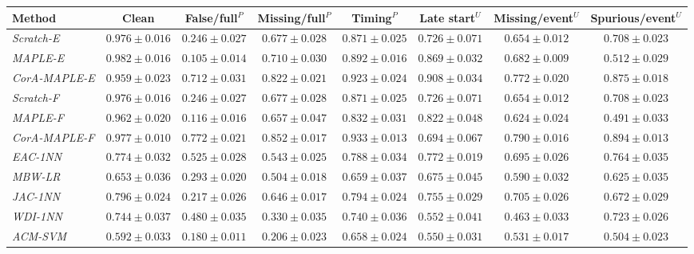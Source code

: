 \begin{tabular*}{\textwidth}{@{\extracolsep{\fill}}lccccccc@{}}
\toprule
Method & Clean & False/full$^{P}$ & Missing/full$^{P}$ & Timing$^{P}$ & Late start$^{U}$ & Missing/event$^{U}$ & Spurious/event$^{U}$ \\
\midrule
\emph{Scratch-E} & $0.976\pm0.016$ & $0.246\pm0.027$ & $0.677\pm0.028$ & $0.871\pm0.025$ & $0.726\pm0.071$ & $0.654\pm0.012$ & $0.708\pm0.023$ \\
\emph{MAPLE-E} & $\mathbf{0.982}\pm0.016$ & $0.105\pm0.014$ & $0.710\pm0.030$ & $0.892\pm0.016$ & $0.869\pm0.032$ & $0.682\pm0.009$ & $0.512\pm0.029$ \\
\emph{CorA-MAPLE-E} & $0.959\pm0.023$ & $0.712\pm0.031$ & $0.822\pm0.021$ & $0.923\pm0.024$ & $\mathbf{0.908}\pm0.034$ & $0.772\pm0.020$ & $0.875\pm0.018$ \\
\emph{Scratch-F} & $0.976\pm0.016$ & $0.246\pm0.027$ & $0.677\pm0.028$ & $0.871\pm0.025$ & $0.726\pm0.071$ & $0.654\pm0.012$ & $0.708\pm0.023$ \\
\emph{MAPLE-F} & $0.962\pm0.020$ & $0.116\pm0.016$ & $0.657\pm0.047$ & $0.832\pm0.031$ & $0.822\pm0.048$ & $0.624\pm0.024$ & $0.491\pm0.033$ \\
\emph{CorA-MAPLE-F} & $0.977\pm0.010$ & $\mathbf{0.772}\pm0.021$ & $\mathbf{0.852}\pm0.017$ & $\mathbf{0.933}\pm0.013$ & $0.694\pm0.067$ & $\mathbf{0.790}\pm0.016$ & $\mathbf{0.894}\pm0.013$ \\
\emph{EAC-1NN} & $0.774\pm0.032$ & $0.525\pm0.028$ & $0.543\pm0.025$ & $0.788\pm0.034$ & $0.772\pm0.019$ & $0.695\pm0.026$ & $0.764\pm0.035$ \\
\emph{MBW-LR} & $0.653\pm0.036$ & $0.293\pm0.020$ & $0.504\pm0.018$ & $0.659\pm0.037$ & $0.675\pm0.045$ & $0.590\pm0.032$ & $0.625\pm0.035$ \\
\emph{JAC-1NN} & $0.796\pm0.024$ & $0.217\pm0.026$ & $0.646\pm0.017$ & $0.794\pm0.024$ & $0.755\pm0.029$ & $0.705\pm0.026$ & $0.672\pm0.029$ \\
\emph{WDI-1NN} & $0.744\pm0.037$ & $0.480\pm0.035$ & $0.330\pm0.035$ & $0.740\pm0.036$ & $0.552\pm0.041$ & $0.463\pm0.033$ & $0.723\pm0.026$ \\
\emph{ACM-SVM} & $0.592\pm0.033$ & $0.180\pm0.011$ & $0.206\pm0.023$ & $0.658\pm0.024$ & $0.550\pm0.031$ & $0.531\pm0.017$ & $0.504\pm0.023$ \\
\bottomrule
\end{tabular*}

